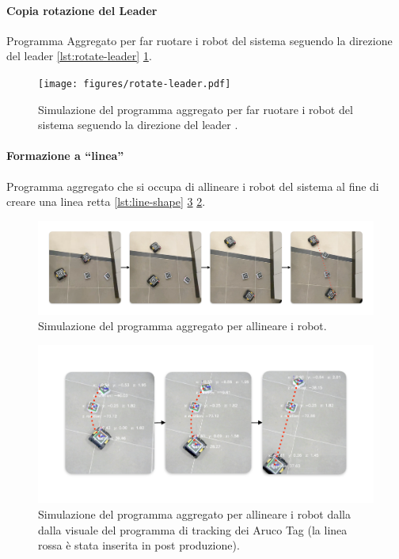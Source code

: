 \documentclass[12pt,a4paper,openright,twoside]{book}
\begin{document}
\paragraph{Copia rotazione del Leader}
Programma Aggregato per far ruotare i robot del sistema seguendo la direzione del leader \cref{lst:rotate-leader} \cref{fig:rotate-leader}.



\begin{figure}
    \centering
    \texttt{[image: figures/rotate-leader.pdf]}
    \caption{Simulazione del programma aggregato per far ruotare i robot del sistema seguendo la direzione del leader .}
    \label{fig:rotate-leader}
\end{figure}

\paragraph{Formazione a ``linea''}
Programma aggregato che si occupa di allineare i robot del sistema al fine di creare una linea retta \cref{lst:line-shape} \cref{fig:line-shape-1} \cref{fig:line-shape-2}.



\begin{figure}
    \centering
    \includegraphics[width=.99\linewidth]{figures/line2.pdf}
    \caption{Simulazione del programma aggregato per allineare i robot.}
    \label{fig:line-shape-2}
\end{figure}

\begin{figure}
    \centering
    \includegraphics[width=.99\linewidth]{figures/line1.pdf}
    \caption{Simulazione del programma aggregato per allineare i robot dalla dalla visuale del programma di tracking dei Aruco Tag (la linea rossa è  stata inserita in post produzione).}
    \label{fig:line-shape-1}
\end{figure}
\end{document}
